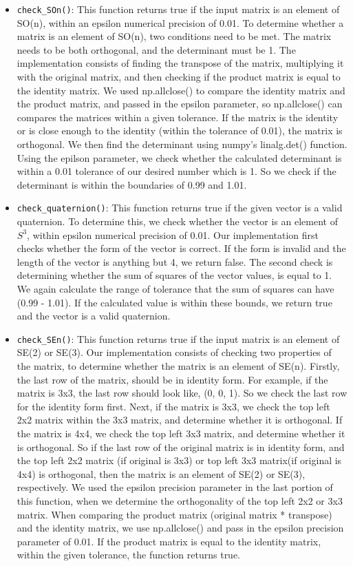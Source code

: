 \documentclass{article}
\begin{document}
\begin{itemize}
    \item \texttt{check\_SOn()}: This function returns true if the input matrix is an element of SO(n), within an epsilon numerical precision of 0.01. To determine whether a matrix is an element of SO(n), two conditions need to be met. The matrix needs to be both orthogonal, and the determinant must be 1. The implementation consists of finding the transpose of the matrix, multiplying it with the original matrix, and then checking if the product matrix is equal to the identity matrix. We used np.allclose() to compare the identity matrix and the product matrix, and passed in the epsilon parameter, so np.allclose() can compares the matrices within a given tolerance. If the matrix is the identity or is close enough to the identity (within the tolerance of 0.01), the matrix is orthogonal. We then find the determinant using numpy's linalg.det() function. Using the epilson parameter, we check whether the calculated determinant is within a 0.01 tolerance of our desired number which is 1. So we check if the determinant is within the boundaries of 0.99 and 1.01.
    \item \texttt{check\_quaternion()}: This function returns true if the given vector is a valid quaternion. To determine this, we check whether the vector is an element of $S^3$, within epsilon numerical precision of 0.01. Our implementation first checks whether the form of the vector is correct. If the form is invalid and the length of the vector is anything but 4, we return false. The second check is determining whether the sum of squares of the vector values, is equal to 1. We again calculate the range of tolerance that the sum of squares can have (0.99 - 1.01). If the calculated value is within these bounds, we return true and the vector is a valid quaternion.
    \item \texttt{check\_SEn()}: This function returns true if the input matrix is an element of SE(2) or SE(3). Our implementation consists of checking two properties of the matrix, to determine whether the matrix is an element of SE(n). Firstly, the last row of the matrix, should be in identity form. For example, if the matrix is 3x3, the last row should look like, (0, 0, 1). So we check the last row for the identity form first. Next, if the matrix is 3x3, we check the top left 2x2 matrix within the 3x3 matrix, and determine whether it is orthogonal. If the matrix is 4x4, we check the top left 3x3 matrix, and determine whether it is orthogonal. So if the last row of the original matrix is in identity form, and the top left 2x2 matrix (if original is 3x3) or top left 3x3 matrix(if original is 4x4) is orthogonal, then the matrix is an element of SE(2) or SE(3), respectively. We used the epsilon precision parameter in the last portion of this function, when we determine the orthogonality of the top left 2x2 or 3x3 matrix. When comparing the product matrix (original matrix * transpose) and the identity matrix, we use np.allclose() and pass in the epsilon precision parameter of 0.01. If the product matrix is equal to the identity matrix, within the given tolerance, the function returns true. 
\end{itemize}
\end{document}
